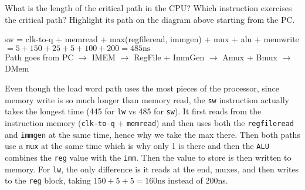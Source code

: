 \begin{blocksection}
\question
What is the length of the critical path in the CPU? Which instruction exercises the critical path?  Highlight its path on the diagram above starting from the PC.




\begin{solution}[1.1in]
sw = clk-to-q + memread + max(regfileread, immgen) + mux + alu + memwrite \\
$= 5+150+25+5+100+200 = 485\text{ns}$\\

Path goes from PC $\rightarrow$ IMEM $\rightarrow$ RegFile $+$ ImmGen $\rightarrow$ Amux $+$ Bmux $\rightarrow$ DMem

Even though the load word path uses the most pieces of the processor, since memory write is so much longer than memory read, the \texttt{sw} instruction actually takes the longest time (445 for \texttt{lw} vs 485 for \texttt{sw}).  It first reads from the instruction memory (\texttt{clk-to-q} + \texttt{memread}) and then uses both the \texttt{regfileread} and \texttt{immgen} at the same time, hence why we take the max there.  Then both paths use a \texttt{mux} at the same time which is why only 1 is there and then the \texttt{ALU} combines the \texttt{reg} value with the \texttt{imm}.  Then the value to store is then written to memory.  For \texttt{lw}, the only difference is it reads at the end, muxes, and then writes to the \texttt{reg} block, taking $150+5+5=160\text{ns}$ instead of 200ns.

\end{solution}

\end{blocksection}

